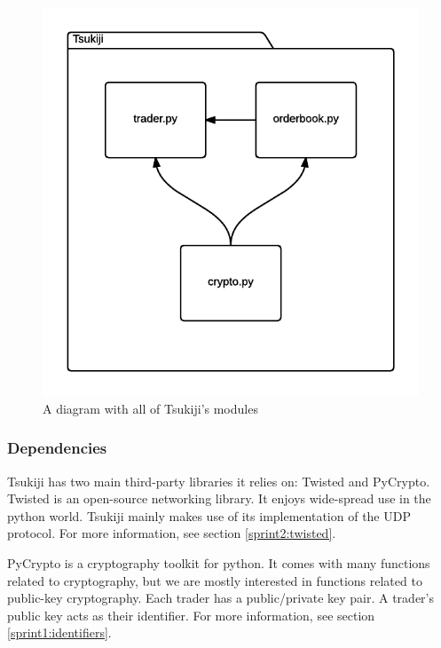 \begin{figure}
  \centering
  \includegraphics[width=\textwidth]{modules}
  \caption{A diagram with all of Tsukiji's modules}
  \label{modulesfig}
\end{figure}

\subsubsection{Dependencies}
\label{dependencies}
Tsukiji has two main third-party libraries it relies on: Twisted\cite{twisted} and PyCrypto\cite{pycrypto}.
Twisted is an open-source networking library.
It enjoys wide-spread use in the python world.
Tsukiji mainly makes use of its implementation of the UDP protocol.
For more information, see section \ref{sprint2:twisted}.

PyCrypto is a cryptography toolkit for python.
It comes with many functions related to cryptography, but we are mostly interested in functions related to public-key cryptography.
Each trader has a public/private key pair.
A trader's public key acts as their identifier.
For more information, see section \ref{sprint1:identifiers}.


